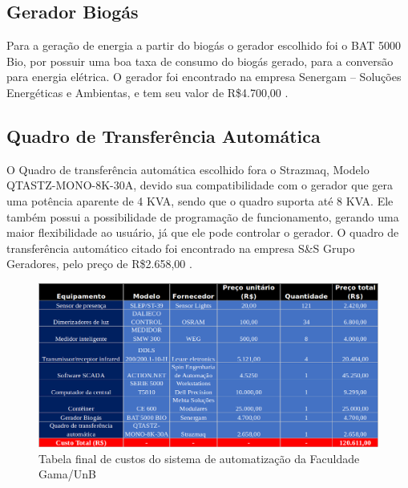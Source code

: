 \subsection{Gerador Biogás}
Para a geração de energia a partir do biogás o gerador escolhido foi o BAT 5000 Bio, por possuir uma boa taxa de consumo do biogás gerado, para a conversão para energia elétrica. O gerador foi encontrado na empresa Senergam – Soluções Energéticas e Ambientas, e tem seu valor de R\$4.700,00 \cite{10}.

\subsection{Quadro de Transferência Automática}
O Quadro de transferência automática escolhido fora o Strazmaq, Modelo QTASTZ-MONO-8K-30A, devido sua compatibilidade com o gerador que gera uma potência aparente de 4 KVA, sendo que o quadro suporta até 8 KVA. Ele também possui a possibilidade de programação de funcionamento, gerando uma maior flexibilidade ao usuário, já que ele pode controlar o gerador. O quadro de transferência automático citado foi encontrado na empresa S\&S Grupo Geradores, pelo preço de R\$2.658,00 \cite{11}.
\begin{figure}[!h]
	\centering
	\includegraphics[width=1.0\textwidth]{figuras/tabelaCustosFinal.png}
	\caption{Tabela final de custos do sistema de automatização da Faculdade Gama/UnB}
	\label{fig:tabelacustosfinais}
\end{figure}








